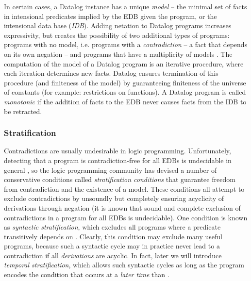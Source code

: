 In certain cases, a Datalog instance has a unique {\em model}  -- the minimal set of facts in intensional predicates implied by the EDB given the program, or the intensional data base ({\em IDB}).  Adding netation to Datalog programs increases expressivity, but creates the possibility of two additional types of programs: programs with no model, i.e. programs with a {\em contradiction} -- a fact that depends on its own negation -- and programs that have a multiplicity of models .  The computation of the model of a Datalog program is an iterative procedure, where each iteration determines new facts.  Datalog ensures termination of this procedure (and finiteness of the model) by guaranteeing finiteness of the universe of constants (for example: restrictions on functions).  A Datalog program is called {\em monotonic} if the addition of facts to the EDB never causes facts from the IDB to be retracted.

\subsubsection{Stratification}
Contradictions are usually undesirable in logic programming. 
 
  Unfortunately, detecting that a program is contradiction-free for all EDBs is undecidable in general , so the logic programming community has devised a number of conservative conditions called {\em stratification conditions} that guarantee freedom from contradiction and the existence of a model.  These conditions all attempt to exclude contradictions by unsoundly but completely ensuring acyclicity of derivations through negation (it is known that sound and complete exclusion of contradictions in a program for all EDBs is undecidable).  One condition is known as {\em syntactic stratification}, which excludes all programs where a predicate  transitively depends on .  Clearly, this condition may exclude many useful programs, because such a syntactic cycle may in practice never lead to a contradiction if all {\em derivations} are acyclic.  In fact, later we will introduce {\em temporal stratification}, which allows such syntactic cycles as long as the program encodes the condition that  occurs at a {\em later time} than .
  

